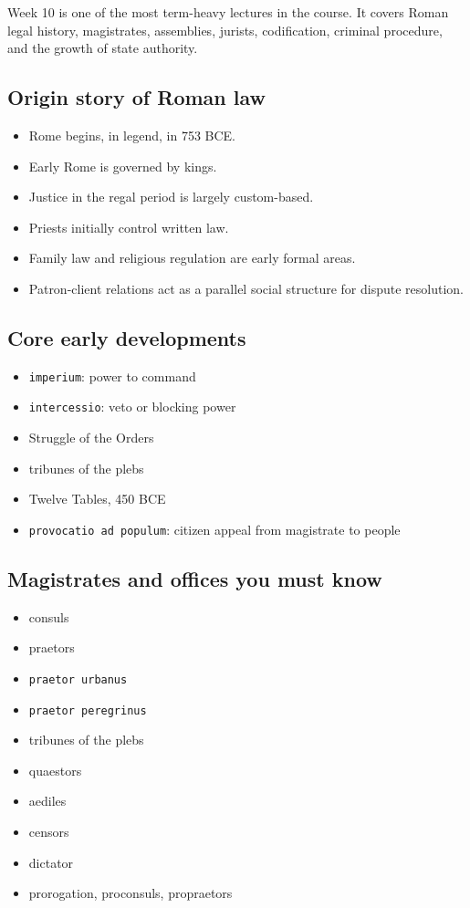 \documentclass[11pt]{article}
\begin{document}
Week 10 is one of the most term-heavy lectures in the course. It covers Roman legal history, magistrates, assemblies, jurists, codification, criminal procedure, and the growth of state authority.

\subsection{Origin story of Roman law}

\begin{itemize}
\item Rome begins, in legend, in 753 BCE.
\item Early Rome is governed by kings.
\item Justice in the regal period is largely custom-based.
\item Priests initially control written law.
\item Family law and religious regulation are early formal areas.
\item Patron-client relations act as a parallel social structure for dispute resolution.
\end{itemize}

\subsection{Core early developments}

\begin{itemize}
\item \texttt{imperium}: power to command
\item \texttt{intercessio}: veto or blocking power
\item Struggle of the Orders
\item tribunes of the plebs
\item Twelve Tables, 450 BCE
\item \texttt{provocatio ad populum}: citizen appeal from magistrate to people
\end{itemize}

\subsection{Magistrates and offices you must know}

\begin{itemize}
\item consuls
\item praetors
\item \texttt{praetor urbanus}
\item \texttt{praetor peregrinus}
\item tribunes of the plebs
\item quaestors
\item aediles
\item censors
\item dictator
\item prorogation, proconsuls, propraetors
\end{itemize}
\end{document}
